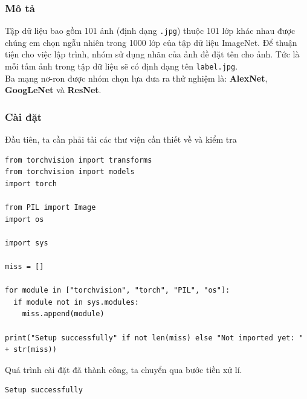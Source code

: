 \documentclass[a4paper]{article}
\begin{document}
\subsubsection{Mô tả}
Tập dữ liệu bao gồm 101 ảnh (định dạng \texttt{.jpg}) thuộc 101 lớp khác nhau được chúng em chọn ngẫu nhiên trong 1000 lớp của tập dữ liệu ImageNet. Để thuận tiện cho việc lập trình, nhóm sử dụng nhãn của ảnh đề đặt tên cho ảnh. Tức là mỗi tấm ảnh trong tập dữ liệu sẽ có định dạng tên \texttt{label.jpg}.\\
Ba mạng nơ-ron được nhóm chọn lựa đưa ra thử nghiệm là: \textbf{AlexNet}, \textbf{GoogLeNet} và \textbf{ResNet}.

\subsubsection{Cài đặt}
Đầu tiên, ta cần phải tải các thư viện cần thiết về và kiểm tra
\begin{lstlisting}
from torchvision import transforms
from torchvision import models
import torch

from PIL import Image
import os

import sys

miss = []

for module in ["torchvision", "torch", "PIL", "os"]:
  if module not in sys.modules:
    miss.append(module)
  
print("Setup successfully" if not len(miss) else "Not imported yet: " + str(miss))
\end{lstlisting}
Quá trình cài đặt đã thành công, ta chuyển qua bước tiền xử lí.
\begin{verbatim}
Setup successfully
\end{verbatim}
\end{document}
